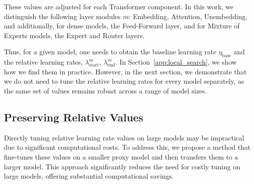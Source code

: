 \documentclass{article} %
\begin{document}
    These values are adjusted for each Transformer component. In this work, we distinguish the following layer modules $m$: Embedding, Attention, Unembedding, and additionally, for dense models, the Feed-Forward layer, and for Mixture of Experts models, the Expert and Router layers.


    Thus, for a given model, one needs to obtain the baseline learning rate $\eta_{\text{base}}$ and the relative learning rates, $\lambda_{\text{start}}^m$, $\lambda_{\text{end}}^m$. In Section~\ref{app:local_search}, we show how we find them in practice. However, in the next section, we demonstrate that we do not need to tune the relative learning rates for every model separately, as the same set of values remains robust across a range of model sizes. 










    \subsection{Preserving Relative Values}


    Directly tuning relative learning rate values on large models may be impractical due to significant computational costs. To address this, we propose a method that fine-tunes these values on a smaller proxy model and then transfers them to a larger model. This approach significantly reduces the need for costly tuning on large models, offering substantial computational savings.
\end{document}
